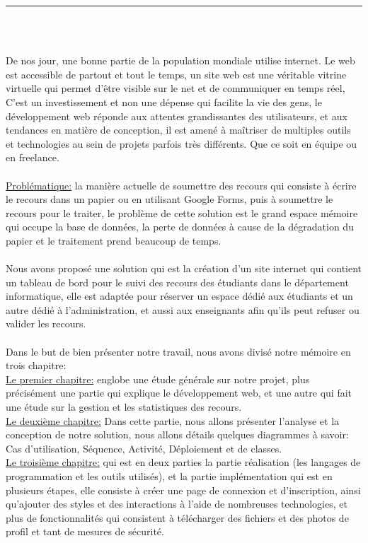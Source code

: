 \documentclass[12pt]{report}
\begin{document}
\begin{center}
    {\color{Blue} \rule{5.5in}{1.4mm} }\\
    \vspace{0.1in}
    \scshape{\fontsize{34}{46}{\bfseries{\color{Blue}{Introduction générale}}}}
    \\
    \vspace{0.5in}
\end{center}
De nos jour, une bonne partie de la population mondiale utilise internet. Le web est accessible de partout et tout le temps, un site web est une véritable vitrine virtuelle qui permet d’être visible sur le net et de communiquer en temps réel, C’est un investissement et non une dépense qui facilite la vie des gens, le développement web réponde aux attentes grandissantes des utilisateurs, et aux tendances en matière de conception, il est amené à maîtriser de multiples outils et technologies au sein de projets parfois très différents. Que ce soit en équipe ou en freelance.
\\\\
\uline{Problématique:} la manière actuelle de soumettre des recours qui consiste à écrire le recours dans un papier ou en utilisant Google Forms, puis à soumettre le recours pour le traiter, le problème de cette solution est le grand espace mémoire qui occupe la base de données, la perte de données à cause de la dégradation du papier et le traitement prend beaucoup de temps.
\\\\
Nous avons proposé une solution qui est la création d'un site internet qui contient un tableau de bord pour le suivi des recours des étudiants dans le département informatique, elle est adaptée pour réserver un espace dédié aux étudiants et un autre dédié à l'administration, et aussi aux enseignants afin qu'ils peut refuser ou valider les recours.
\\\\
Dans le but de bien présenter notre travail, nous avons divisé notre mémoire en trois chapitre:
\\
\uline{Le premier chapitre:} englobe une étude générale sur notre projet, plus précisément une partie qui explique le développement web, et une autre qui fait une étude sur la gestion et les statistiques des recours.
\\
\uline{Le deuxième chapitre:} 
Dans cette partie, nous allons présenter l'analyse et la conception de notre solution, nous allons détails quelques diagrammes à savoir: Cas d'utilisation, Séquence, Activité,  Déploiement et de classes.
\\
\uline{Le troisième chapitre:} qui est en deux parties la partie réalisation (les langages de programmation et les outils utilisés), et la partie implémentation qui est en plusieurs étapes, elle consiste à créer une page de connexion et d'inscription, ainsi qu'ajouter des styles et des interactions à l'aide de nombreuses technologies, et plus de fonctionnalités qui consistent à télécharger des fichiers et des photos de profil et tant de mesures de sécurité.
\end{document}
